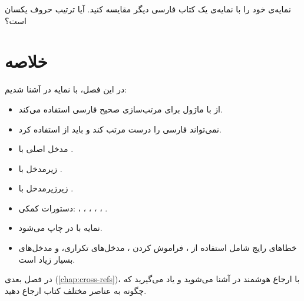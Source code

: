 \begin{exercise}
    نمایه‌ی خود را با نمایه‌ی یک کتاب فارسی
    دیگر مقایسه کنید. آیا ترتیب حروف
    یکسان است؟
    \label{exc:index-compare}
\end{exercise}

\section{خلاصه}
\label{sec:index-summary}

در این فصل، با نمایه در  آشنا
شدیم:

\begin{itemize}
    \item {} از  با
    ماژول  برای مرتب‌سازی
    صحیح فارسی استفاده می‌کند.

    \item {} نمی‌تواند فارسی را
    درست مرتب کند و باید از  استفاده
    کرد.

    \item مدخل اصلی با .

    \item زیرمدخل با .

    \item زیرزیرمدخل با
    .

    \item دستورات کمکی: ،
    ، ،
    ، ،
    .

    \item نمایه با  در
     چاپ می‌شود.

    \item خطاهای رایج شامل استفاده از
    ، فراموش کردن
    ، مدخل‌های تکراری، و
    مدخل‌های بسیار زیاد است.
\end{itemize}

در فصل بعدی (\cref{chap:cross-refs})، با
ارجاع هوشمند در  آشنا می‌شوید
و یاد می‌گیرید که چگونه به عناصر مختلف کتاب
ارجاع دهید.